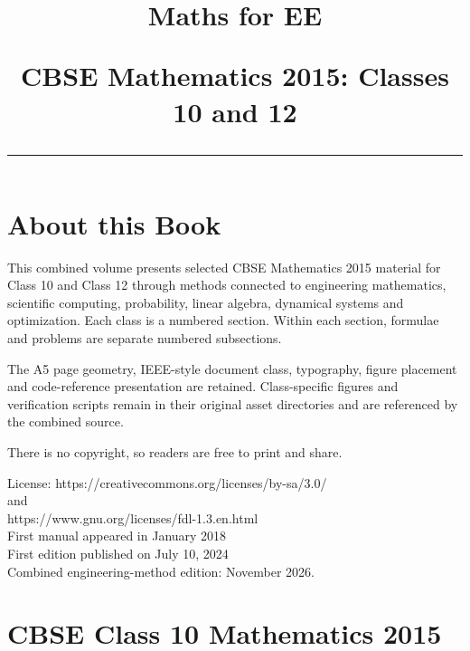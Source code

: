 \documentclass[journal]{IEEEtran}
\begin{document}

\onecolumn
\title{
  \begin{center}
  {\Huge Maths for EE\par}
  \vspace{12mm}
  {\LARGE CBSE Mathematics 2015: Classes 10 and 12\par}
  \vspace{6mm}
  \rule{0.4\columnwidth}{0.4pt}
  \end{center}
}
\maketitle
\newpage
\section*{About this Book}
This combined volume presents selected CBSE Mathematics 2015 material for
Class 10 and Class 12 through methods connected to engineering mathematics,
scientific computing, probability, linear algebra, dynamical systems and
optimization. Each class is a numbered section. Within each section,
formulae and problems are separate numbered subsections.

The A5 page geometry, IEEE-style document class, typography, figure placement
and code-reference presentation are retained. Class-specific figures and
verification scripts remain in their original asset directories and are
referenced by the combined source.

There is no copyright, so readers are free to print and share.

License: https://creativecommons.org/licenses/by-sa/3.0/
\\
and
\\
https://www.gnu.org/licenses/fdl-1.3.en.html
\\
First manual appeared in January 2018
\\
First edition published on July 10, 2024
\\
Combined engineering-method edition: November 2026.
\newpage
\tableofcontents
\newpage
\onecolumn

\renewcommand{\theenumi}{\thesection.\thesubsection.\arabic{enumi}}
\renewcommand{\thetable}{\theenumi}

\section{CBSE Class 10 Mathematics 2015}
\end{document}
